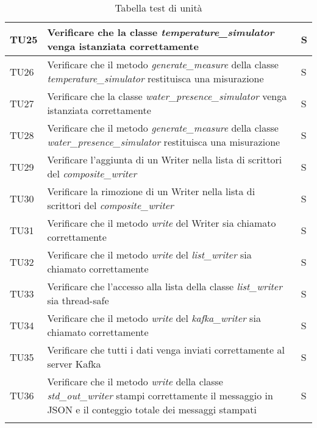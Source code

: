 \begin{longtable}{|C{1.9cm}|L{5.5cm}|C{2cm}|}
    TU25 & Verificare che la classe \textit{temperature\_simulator} venga istanziata correttamente & S \\
    \hline

    TU26 & Verificare che il metodo \textit{generate\_measure} della classe \textit{temperature\_simulator} restituisca una misurazione & S \\
    \hline

    TU27 & Verificare che la classe \textit{water\_presence\_simulator} venga istanziata correttamente & S \\
    \hline

    TU28 & Verificare che il metodo \textit{generate\_measure} della classe \textit{water\_presence\_simulator} restituisca una misurazione & S \\
    \hline

    TU29 & Verificare l'aggiunta di un Writer nella lista di scrittori del \textit{composite\_writer} & S \\   
    \hline

    TU30 & Verificare la rimozione di un Writer nella lista di scrittori del \textit{composite\_writer} & S \\
    \hline

    TU31 & Verificare che il metodo \textit{write} del Writer sia chiamato correttamente & S \\
    \hline

    TU32 & Verificare che il metodo \textit{write} del \textit{list\_writer} sia chiamato correttamente & S \\
    \hline

    TU33 & Verificare che l'accesso alla lista della classe \textit{list\_writer} sia thread-safe & S \\
    \hline

    TU34 & Verificare che il metodo \textit{write} del \textit{kafka\_writer} sia chiamato correttamente & S \\
    \hline

    TU35 & Verificare che tutti i dati venga inviati correttamente al server Kafka & S \\
    \hline

    TU36 & Verificare che il metodo \textit{write} della classe \textit{std\_out\_writer} stampi correttamente il messaggio in JSON e il conteggio totale dei messaggi stampati & S \\ 
    \hline


    \caption{Tabella test di unità}
\end{longtable}
